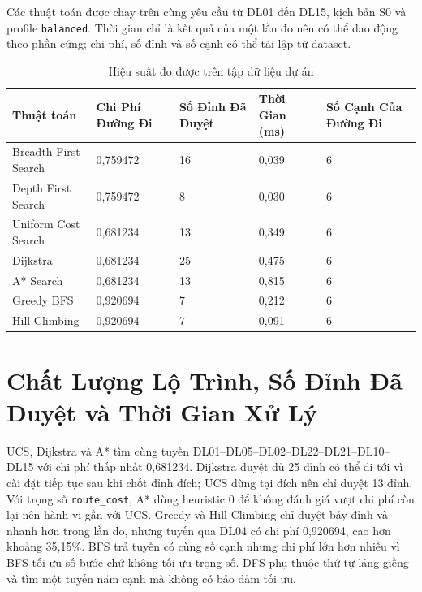 Các thuật toán được chạy trên cùng yêu cầu từ DL01 đến DL15, kịch bản S0 và
profile \texttt{balanced}. Thời gian chỉ là kết quả của một lần đo nên có thể
dao động theo phần cứng; chi phí, số đỉnh và số cạnh có thể tái lập từ dataset.

\begin{table}[h!]
\centering
\caption{Hiệu suất đo được trên tập dữ liệu dự án}
\scriptsize
\begin{tabular}{p{3.2cm}p{2.7cm}p{2.7cm}p{2.3cm}p{2.4cm}}
\toprule
Thuật toán & Chi Phí Đường Đi & Số Đỉnh Đã Duyệt & Thời Gian (ms) & Số Cạnh Của Đường Đi \\
\midrule
Breadth First Search & 0,759472 & 16 & 0,039 & 6 \\
Depth First Search & 0,759472 & 8 & 0,030 & 6 \\
Uniform Cost Search & 0,681234 & 13 & 0,349 & 6 \\
Dijkstra & 0,681234 & 25 & 0,475 & 6 \\
A* Search & 0,681234 & 13 & 0,815 & 6 \\
Greedy BFS & 0,920694 & 7 & 0,212 & 6 \\
Hill Climbing & 0,920694 & 7 & 0,091 & 6 \\
\bottomrule
\end{tabular}
\end{table}

\section{Chất Lượng Lộ Trình, Số Đỉnh Đã Duyệt và Thời Gian Xử Lý}

UCS, Dijkstra và A* tìm cùng tuyến
DL01--DL05--DL02--DL22--DL21--DL10--DL15 với chi phí thấp nhất 0,681234.
Dijkstra duyệt đủ 25 đỉnh có thể đi tới vì cài đặt tiếp tục sau khi chốt đỉnh
đích; UCS dừng tại đích nên chỉ duyệt 13 đỉnh. Với trọng số
\texttt{route\_cost}, A* dùng heuristic 0 để không đánh giá vượt chi phí còn lại
nên hành vi gần với UCS. Greedy và Hill Climbing chỉ duyệt bảy đỉnh và nhanh hơn
trong lần đo, nhưng tuyến qua DL04 có chi phí 0,920694, cao hơn khoảng 35,15\%.
BFS trả tuyến có cùng số cạnh nhưng chi phí lớn hơn nhiều vì BFS tối ưu số bước
chứ không tối ưu trọng số. DFS phụ thuộc thứ tự láng giềng và tìm một tuyến năm
cạnh mà không có bảo đảm tối ưu.

